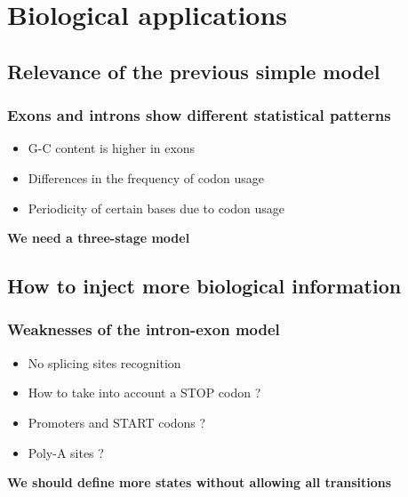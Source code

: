 \documentclass{beamer}
\begin{document}
\section{Biological applications}
\subsection{Relevance of the previous simple model}

\begin{frame}
\frametitle{Exons and introns show different statistical patterns}
\begin{itemize}
	\item G-C content is higher in exons
	\item Differences in the frequency of codon usage
	\item Periodicity of certain bases due to codon usage
\end{itemize}
		
	\vspace{0.5cm}
	
	\pause\begin{center}
		\textbf{We need a three-stage model }
	\end{center}
\end{frame}

\subsection{How to inject more biological information}
\begin{frame}
\frametitle{Weaknesses of the intron-exon model}
	\begin{itemize}
		\item No splicing sites recognition 
		\item How to take into account a STOP codon ? 
		\item Promoters and START codons ? 
		\item Poly-A sites ?
	\end{itemize}
	
	\vspace{0.5cm}
	
	\pause\begin{center}
		\textbf{We should define more states without allowing all transitions}
	\end{center}
	
\end{frame}
\end{document}
